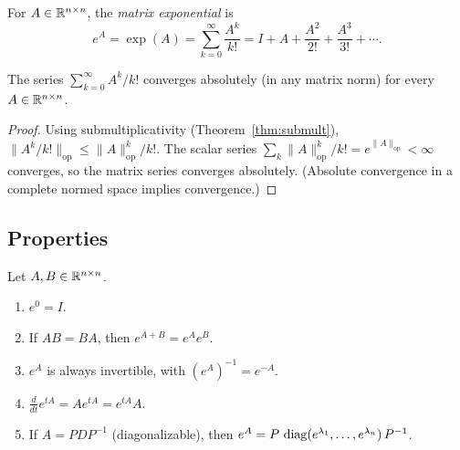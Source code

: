 \documentclass[11pt,a4paper]{article}
\begin{document}
\begin{definition}
\label{def:matrix_exp}
For $A \in \mathbb{R}^{n \times n}$, the \emph{matrix exponential} is
\[
  e^A = \exp(A) = \sum_{k=0}^{\infty} \frac{A^k}{k!}
  = I + A + \frac{A^2}{2!} + \frac{A^3}{3!} + \cdots.
\]
\end{definition}

\begin{proposition}
\label{prop:exp_convergence}
The series $\sum_{k=0}^\infty A^k / k!$ converges absolutely (in
any matrix norm) for every $A \in \mathbb{R}^{n \times n}$.
\end{proposition}

\begin{proof}
Using submultiplicativity (Theorem~\ref{thm:submult}),
$\|A^k/k!\|_{\mathrm{op}} \leq \|A\|_{\mathrm{op}}^k / k!$.
The scalar series $\sum_k \|A\|_{\mathrm{op}}^k / k!
= e^{\|A\|_{\mathrm{op}}} < \infty$ converges, so the matrix
series converges absolutely.  (Absolute convergence in a complete normed
space implies convergence.)
\end{proof}

\subsection{Properties}

\begin{theorem}
\label{thm:exp_properties}
Let $A, B \in \mathbb{R}^{n \times n}$.
\begin{enumerate}[nosep]
  \item $e^{0} = I$.
  \item If $AB = BA$, then $e^{A+B} = e^A e^B$.
  \item $e^A$ is always invertible, with $(e^A)^{-1} = e^{-A}$.
  \item $\frac{d}{dt} e^{tA} = A e^{tA} = e^{tA} A$.
  \item If $A = PDP^{-1}$ (diagonalizable), then
        $e^A = P\, \operatorname{diag}(e^{\lambda_1}, \ldots, e^{\lambda_n})\, P^{-1}$.
\end{enumerate}
\end{theorem}
\end{document}
